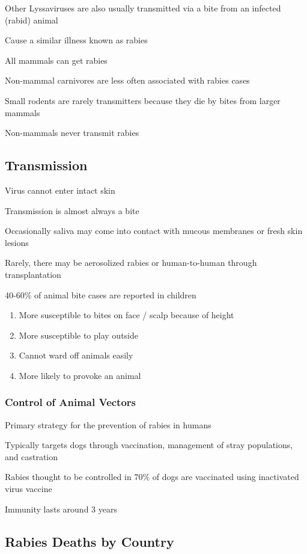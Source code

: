 \documentclass{notes}
\begin{document}
Other Lyssaviruses are also usually transmitted via a bite from an infected (rabid) animal

\tab \indicates Cause a similar illness known as rabies

All mammals can get rabies

\tab Non-mammal carnivores are less often associated with rabies cases

\tab \tab Small rodents are rarely transmitters because they die by bites from larger mammals

\tab \tab Non-mammals never transmit rabies

\subsection{Transmission}

Virus cannot enter intact skin

\tab \indicates Transmission is almost always a bite

\tab Occasionally saliva may come into contact with mucous membranes or fresh skin lesions

\tab Rarely, there may be aerosolized rabies or human-to-human through transplantation

40-60\% of animal bite cases are reported in children

\begin{enumerate}
    \item More susceptible to bites on face / scalp because of height
    \item More susceptible to play outside
    \item Cannot ward off animals easily
    \item More likely to provoke an animal
\end{enumerate}

\subsubsection{Control of Animal Vectors}

Primary strategy for the prevention of rabies in humans

Typically targets dogs through vaccination, management of stray populations, and castration

Rabies thought to be controlled in 70\% of dogs are vaccinated using inactivated virus vaccine

\tab \indicates Immunity lasts around 3 years


\subsection{Rabies Deaths by Country}
\end{document}
